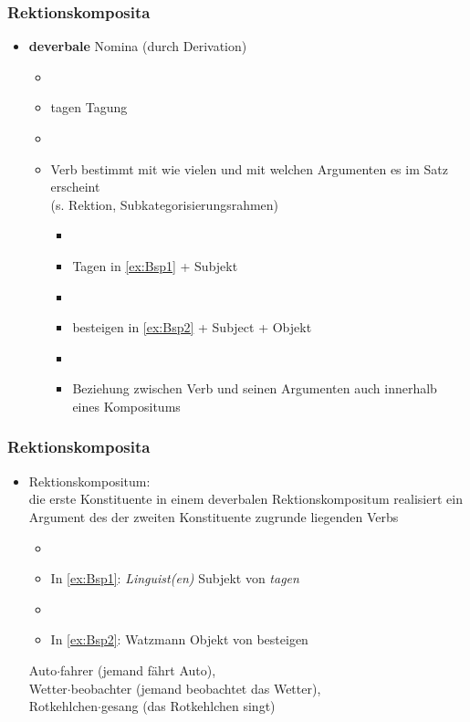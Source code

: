 \begin{frame}
\frametitle{Rektionskomposita}

\begin{itemize}
	\item \textbf{deverbale} Nomina (durch Derivation)
	
	\begin{itemize}
		\item[]
		\item tagen \ras Tagung
		\item[]
		\item Verb bestimmt mit wie vielen und mit welchen Argumenten es im Satz erscheint\\
                  (s. Rektion, Subkategorisierungsrahmen)
		
		\begin{itemize}
			\item[]
			\item Tagen in \ref{ex:Bsp1} + Subjekt
			\item[]
			\item besteigen in \ref{ex:Bsp2} + Subject + Objekt
			\item[]
			\item Beziehung zwischen Verb und seinen Argumenten auch innerhalb eines Kompositums
		\end{itemize}
	\end{itemize}
\end{itemize}


\end{frame}


\begin{frame}
\frametitle{Rektionskomposita}

\begin{itemize}
	\item Rektionskompositum: \\
	die erste Konstituente in einem deverbalen Rektionskompositum realisiert ein Argument des der zweiten Konstituente zugrunde liegenden Verbs
	
	\begin{itemize}
		\item[]
		\item In \ref{ex:Bsp1}: \emph{Linguist(en)} \ras Subjekt von \emph{tagen}
		\item[]
		\item In \ref{ex:Bsp2}: Watzmann \ras Objekt von besteigen
	\end{itemize}
	
	\ea	 Auto$\cdot$fahrer (jemand fährt Auto), \\
		 Wetter$\cdot$beobachter (jemand beobachtet das Wetter), \\
		 Rotkehlchen$\cdot$gesang (das Rotkehlchen singt)
	\z
		 
\end{itemize}


\end{frame}


